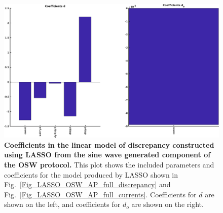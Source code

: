 \documentclass[11pt,a4paper,oneside]{article}
\begin{document}
\clearpage

\begin{figure}[t]
\begin{center}
\includegraphics[scale=0.42]{Figures/LASSO_OSW_AP_full_coefficients.png}
\caption{\textbf{Coefficients in the linear model of discrepancy constructed using LASSO from the sine wave generated component of the OSW protocol.} This plot shows the included parameters and coefficients for the model produced by LASSO shown in Fig.~\ref{Fig_LASSO_OSW_AP_full_discrepancy} and Fig.~\ref{Fig_LASSO_OSW_AP_full_currents}. Coefficients for $d$ are shown on the left, and coefficients for $d_o$ are shown on the right.} 
\label{Fig_LASSO_OSW_AP_full_coefficients}
\end{center}
\end{figure}
\end{document}
